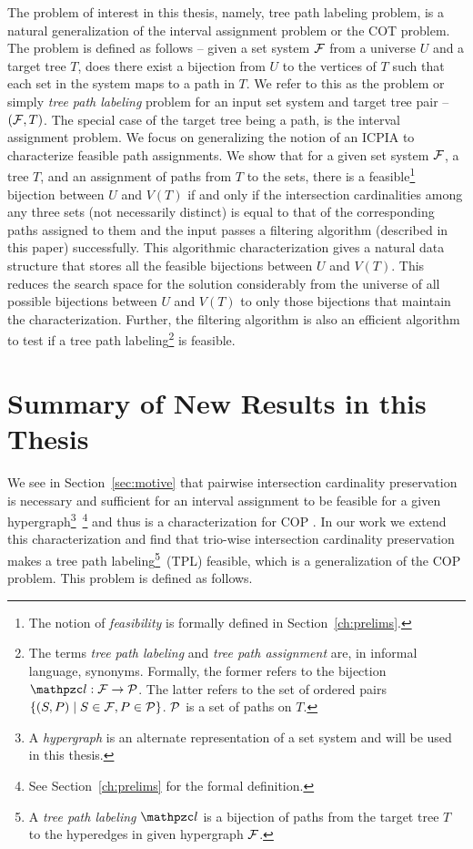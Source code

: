 The problem of interest in this thesis, namely, tree path labeling
problem, is a natural generalization of the interval assignment
problem or the COT problem. The problem is defined as follows -- given
a set system ${\cal F}$ from a universe $U$ and a target tree $T$, does
there exist a bijection from $U$ to the vertices of $T$ such that each
set in the system maps to a path in $T$.  We refer to this as the
{\CFTPL} problem or simply {\em tree path labeling} problem for an
input set system and target tree pair -- $({\cal F},T)$. The special case
of the target tree being a path, is the interval assignment problem.
We focus on generalizing the notion of an ICPIA \cite{nsnrs09} to
characterize feasible path assignments.  We show that for a given set
system ${\cal F}$, a tree $T$, and an assignment of paths from $T$ to the
sets, there is a feasible\footnote{The notion of {\em feasibility} is
  formally defined in Section~\ref{ch:prelims}.}  bijection between
$U$ and $V(T)$ if and only if the intersection cardinalities among any
three sets (not necessarily distinct) is equal to that of the
corresponding paths assigned to them and the input passes a filtering
algorithm (described in this paper) successfully.  This algorithmic
characterization gives a natural data structure that stores all the
 feasible bijections between $U$ and $V(T)$. This
reduces the search space for the solution considerably from the
universe of all possible bijections between $U$ and $V(T)$ to only
those bijections that maintain the characterization.  Further, the
filtering algorithm is also an efficient algorithm to test if a tree
path labeling\footnote{The terms {\em tree path labeling} and {\em
    tree path assignment} are, in informal language,
  synonyms. Formally, the former refers to the bijection $\cl: \cF
  \rightarrow \cP$. The latter refers to the set of ordered pairs
  $\{(S, P) \mid S \in {\cal F}, P \in {\cal P}\}$. ${\cal P}$ is a set of paths on
  $T$.} is feasible.


\section{Summary of New Results in this Thesis}
\label{sec:results}

We see in Section~\ref{sec:motive} that pairwise intersection
cardinality preservation is necessary and sufficient for an interval
assignment to be feasible for a given hypergraph\footnote{A {\em
    hypergraph} is an alternate representation of a set system and
  will be used in this thesis.}~\footnote{See Section~\ref{ch:prelims} for the
  formal definition.} and thus is a characterization for COP
\cite{nsnrs09}.  In our work we extend this characterization
and find that trio-wise intersection cardinality preservation makes a
tree path labeling\footnote{A {\em tree path labeling} $\cl$ is a
  bijection of paths from the target tree $T$ to the hyperedges in
  given hypergraph ${\cal F}$.}~\footnotemark[4]  (TPL) feasible, which is a generalization of the COP
problem. This problem is defined as follows.

